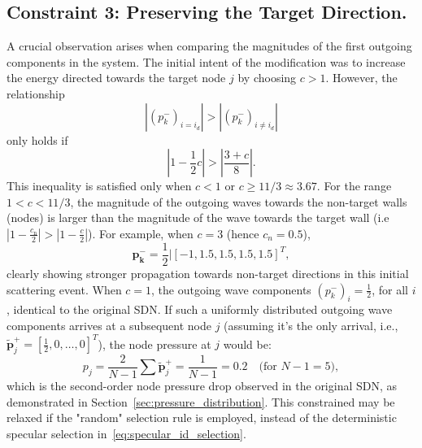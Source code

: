 \documentclass[journal]{IEEEtran}
\begin{document}
\subsection{Constraint 3: Preserving the Target Direction.}
A crucial observation arises when comparing the magnitudes of the first outgoing components in the system. The initial intent of the modification was to increase the energy directed towards the target node $j$ by choosing $c>1$. However, the relationship
\begin{equation}
\label{C2_eqn}
|\left(p_{k}^{-}\right)_{i=i_d}| > |\left(p_{k}^{-}\right)_{i\neq i_d}|
\end{equation}
only holds if 
\begin{equation}
\label{C1}
|1-\frac{1}{2}c| > \left|\frac{3 + c}{8}\right|.
\end{equation}
This inequality is satisfied only when $c<1$ or $c\geq 11/3 \approx 3.67$.
For the range $1<c<11/3$, the magnitude of the outgoing waves towards the non-target walls (nodes) is larger than the magnitude of the wave towards the target wall (i.e $ |1-\frac{c_{\text{n}}}{2}| >|1-\frac{c}{2}|$). For example, when $c=3$ (hence $c_n=0.5$),
\begin{equation}
\label{ex:target_gets_smaller_p}
\mathbf{p_{k}^{-}} = \frac{1}{2}|[-1, 1.5, 1.5, 1.5, 1.5]^{T},
\end{equation}
clearly showing stronger propagation towards non-target directions in this initial scattering event. 
When \( c = 1 \), the outgoing wave components \( (p_k^-)_i = \frac{1}{2} \), for all $i$, identical to the original SDN. If such a uniformly distributed outgoing wave components arrives at a subsequent node \( j \) (assuming it's the only arrival, i.e., \( \mathbf{\tilde p}_j^+ = [\frac{1}{2}, 0, \ldots, 0]^T \)), the node pressure at \( j \) would be:
\begin{equation}
    p_j = \frac{2}{N-1} \sum \mathbf {\tilde p}_j^+ = \frac{1}{N-1} = 0.2 \quad \text{(for } N - 1 = 5\text{)},
\end{equation}
which is the second-order node pressure drop observed in the original SDN, as demonstrated in Section~\ref{sec:pressure_distribution}. This constrained may be relaxed if the "random" selection rule is employed, instead of the deterministic specular selection in~\eqref{eq:specular_id_selection}.
\end{document}
